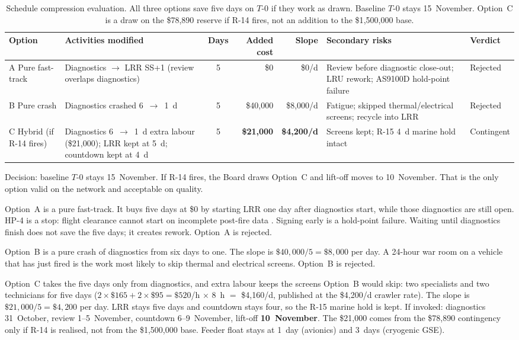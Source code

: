 \begin{table}[H]
\centering
\small
\setlength{\tabcolsep}{3.5pt}
\caption[Schedule compression evaluation]{Schedule compression evaluation. All three options save five days on $T$-0 if they work as drawn. Baseline $T$-0 stays 15~November. Option~C is a draw on the \$78{,}890 reserve if R-14 fires, not an addition to the \$1{,}500{,}000 base.}
\label{tab:compression}
\begin{tabularx}{\textwidth}{@{}l >{\raggedright\arraybackslash}X c r r >{\raggedright\arraybackslash}X l@{}}
\toprule
Option & Activities modified & Days & Added cost & Slope & Secondary risks & Verdict \\
\midrule
A Pure fast-track & Diagnostics $\to$ LRR SS+1 (review overlaps diagnostics) & 5 & \$0 & \$0/d & Review before diagnostic close-out; LRU rework; AS9100D hold-point failure & Rejected \\
B Pure crash & Diagnostics crashed 6~$\to$~1~d & 5 & \$40{,}000 & \$8{,}000/d & Fatigue; skipped thermal/electrical screens; recycle into LRR & Rejected \\
C Hybrid (if R-14 fires) & Diagnostics 6~$\to$~1~d extra labour (\$21{,}000); LRR kept at 5~d; countdown kept at 4~d & 5 & \textbf{\$21{,}000} & \textbf{\$4{,}200/d} & Screens kept; R-15 4~d marine hold intact & Contingent \\
\bottomrule
\end{tabularx}
\end{table}

Decision: baseline $T$-0 stays 15~November. If R-14 fires, the Board draws Option~C and lift-off moves to 10~November. That is the only option valid on the network and acceptable on quality.

Option~A is a pure fast-track. It buys five days at \$0 by starting LRR one day after diagnostics start, while those diagnostics are still open. HP-4 is a stop: flight clearance cannot start on incomplete post-fire data \citep{sae2016}. Signing early is a hold-point failure. Waiting until diagnostics finish does not save the five days; it creates rework. Option~A is rejected.

Option~B is a pure crash of diagnostics from six days to one. The slope is $\$40{,}000/5 = \$8{,}000$ per day. A 24-hour war room on a vehicle that has just fired is the work most likely to skip thermal and electrical screens. Option~B is rejected.

Option~C takes the five days only from diagnostics, and extra labour keeps the screens Option~B would skip: two specialists and two technicians for five days ($2\times\$165 + 2\times\$95 = \$520$/h $\times$ 8~h $=$ \$4{,}160/d, published at the \$4{,}200/d crawler rate). The slope is $\$21{,}000/5 = \$4{,}200$ per day. LRR stays five days and countdown stays four, so the R-15 marine hold is kept. If invoked: diagnostics 31~October, review 1--5~November, countdown 6--9~November, lift-off \textbf{10~November}. The \$21{,}000 comes from the \$78{,}890 contingency only if R-14 is realised, not from the \$1{,}500{,}000 base. Feeder float stays at 1~day (avionics) and 3~days (cryogenic GSE).

